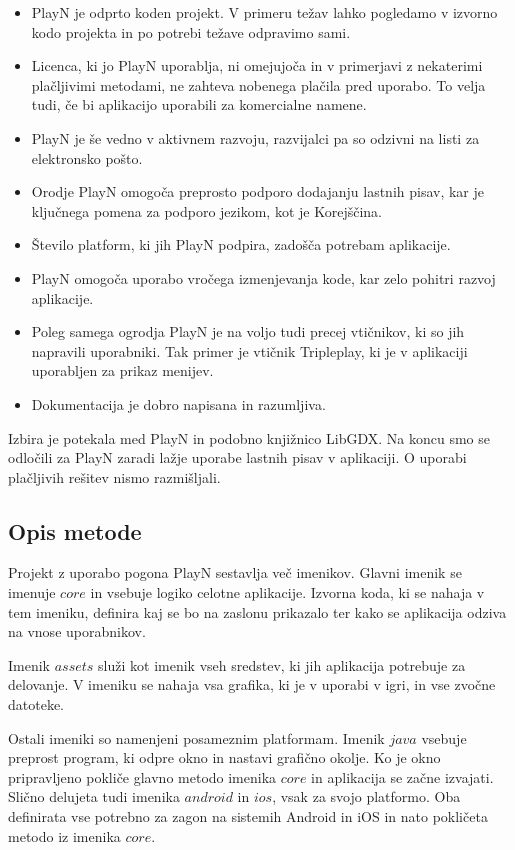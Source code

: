 \begin{itemize}
\item PlayN je odprto koden projekt. V primeru težav lahko pogledamo v izvorno kodo projekta in po potrebi težave odpravimo sami.
\item Licenca, ki jo PlayN uporablja, ni omejujoča in v primerjavi z nekaterimi plačljivimi metodami, ne zahteva nobenega plačila pred uporabo. To velja tudi, če bi aplikacijo uporabili za komercialne namene.
\item PlayN je še vedno v aktivnem razvoju, razvijalci pa so odzivni na listi za elektronsko pošto.
\item Orodje PlayN omogoča preprosto podporo dodajanju lastnih pisav, kar je ključnega pomena za podporo jezikom, kot je Korejščina.
\item Število platform, ki jih PlayN podpira, zadošča potrebam aplikacije.
\item PlayN omogoča uporabo vročega izmenjevanja kode, kar zelo pohitri razvoj aplikacije.
\item Poleg samega ogrodja PlayN je na voljo tudi precej vtičnikov, ki so jih napravili uporabniki. Tak primer je vtičnik Tripleplay, ki je v aplikaciji uporabljen za prikaz menijev.
\item Dokumentacija je dobro napisana in razumljiva.
\end{itemize}

Izbira je potekala med PlayN in podobno knjižnico LibGDX. Na koncu smo se odločili za PlayN zaradi lažje uporabe lastnih pisav v aplikaciji. O uporabi plačljivih rešitev nismo razmišljali.

\subsection{Opis metode}

Projekt z uporabo pogona PlayN sestavlja več imenikov. Glavni imenik se imenuje $core$ in vsebuje logiko celotne aplikacije. Izvorna koda, ki se nahaja v tem imeniku, definira kaj se bo na zaslonu prikazalo ter kako se aplikacija odziva na vnose uporabnikov. 

Imenik $assets$ služi kot imenik vseh sredstev, ki jih aplikacija potrebuje za delovanje. V imeniku se nahaja vsa grafika, ki je v uporabi v igri, in vse zvočne datoteke.

Ostali imeniki so namenjeni posameznim platformam. Imenik $java$ vsebuje preprost program, ki odpre okno in nastavi grafično okolje. Ko je okno pripravljeno pokliče glavno metodo imenika $core$ in aplikacija se začne izvajati. Slično delujeta tudi imenika $android$ in $ios$, vsak za svojo platformo. Oba definirata vse potrebno za zagon na sistemih Android in iOS in nato pokličeta metodo iz imenika $core$.


